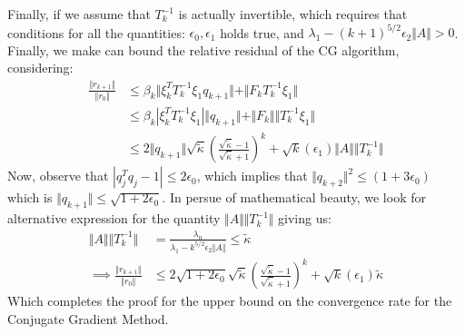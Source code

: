 \documentclass[]{article}
\theoremstyle{definition}
\begin{document}
            Finally, if we assume that $T_k^{-1}$ is actually invertible, which requires that conditions for all the quantities: $\epsilon_0, \epsilon_1$ holds true, and $\lambda_1 - (k + 1)^{5/2} \epsilon_2\Vert A\Vert > 0$. Finally, we make can bound the relative residual of the CG algorithm, considering: 
            \begin{align}
                \frac{\Vert r_{k + 1}\Vert}
                {
                    \Vert r_0\Vert
                } &\le
                \beta_k \Vert
                    \xi_k^T T_k^{-1}\xi_1 q_{k + 1}
                \Vert + 
                \Vert F_kT_k^{-1}\xi_1 \Vert
                \\
                & \le 
                \beta_k|\xi_k^T T_k^{-1}\xi_1|
                \Vert q_{k + 1}\Vert + 
                \Vert F_k\Vert  \Vert T^{-1}_k\xi_1\Vert
                \\
                & \le 
                2 \Vert q_{k + 1}\Vert\sqrt{\tilde{\kappa}}
                    \left(
                        \frac{\sqrt{\tilde{\kappa}} - 1}{\sqrt{\tilde{\kappa}} + 1}
                    \right)^k
                + 
                \sqrt{k}(\epsilon_1) \Vert A\Vert 
                \Vert T^{-1}_k\Vert
            \end{align}
            Now, observe that $|q_j^Tq_j - 1|\le 2\epsilon_0$, which implies that $\Vert q_{k + 2}\Vert^2 \le (1 + 3\epsilon_0)$ which is $\Vert q_{k + 1}\Vert \le \sqrt{1 + 2\epsilon_0}$. In persue of mathematical beauty, we look for alternative expression for the quantity $\Vert A\Vert \Vert T^{-1}_k\Vert$ giving us: 
            \begin{align}
                \Vert A\Vert\Vert T_k^{-1}\Vert &= \frac{\lambda_n}{\lambda_1 - k^{5/2}\epsilon_2\Vert A\Vert} \le \tilde{\kappa}
                \\
                \implies 
                \frac{\Vert r_{k + 1}\Vert}
                {
                    \Vert r_0\Vert
                } &\le 
                2  \sqrt{1 + 2\epsilon_0}\sqrt{\tilde{\kappa}}
                    \left(
                        \frac{\sqrt{\tilde{\kappa}} - 1}{\sqrt{\tilde{\kappa}} + 1}
                    \right)^k
                + \sqrt{k}(\epsilon_1) \tilde{\kappa}
            \end{align}
            Which completes the proof for the upper bound on the convergence rate for the Conjugate Gradient Method. 
\end{document}
